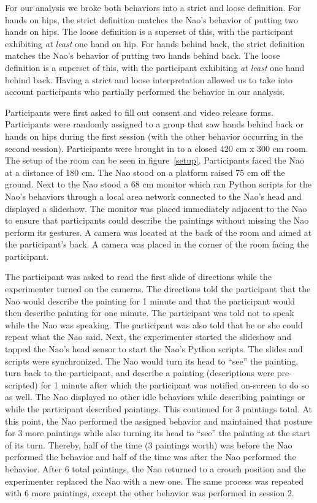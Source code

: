\documentclass{acm_proc_article-sp}
\begin{document}
For our analysis we broke both behaviors into a strict and loose definition. For hands on hips, the strict definition matches the Nao's behavior of putting two hands on hips. The loose definition is a superset of this, with the participant exhibiting \textit{at least} one hand on hip. For hands behind back, the strict definition matches the Nao's behavior of putting two hands behind back. The loose definition is a superset of this, with the participant exhibiting \textit{at least} one hand behind back. Having a strict and loose interpretation allowed us to take into account participants who partially performed the behavior in our analysis. 

Participants were first asked to fill out consent and video release forms. Participants were randomly assigned to a group that saw hands behind back or hands on hips during the first session (with the other behavior occurring in the second session). Participants were brought in to a closed 420 cm x 300 cm room. The setup of the room can be seen in figure~\ref{setup}. Participants faced the Nao at a distance of 180 cm. The Nao stood on a platform raised 75 cm off the ground. Next to the Nao stood a 68 cm monitor which ran Python scripts for the Nao's behaviors through a local area network connected to the Nao's head and displayed a slideshow. The monitor was placed immediately adjacent to the Nao to ensure that participants could describe the paintings without missing the Nao perform its gestures. A camera was located at the back of the room and aimed at the participant's back. A camera was placed in the corner of the room facing the participant.

The participant was asked to read the first slide of directions while the experimenter turned on the cameras. The directions told the participant that the Nao would describe the painting for 1 minute and that the participant would then describe painting for one minute. The participant was told not to speak while the Nao was speaking. The participant was also told that he or she could repeat what the Nao said. Next, the experimenter started the slideshow and tapped the Nao's head sensor to start the Nao's Python scripts. The slides and scripts were synchronized. The Nao would turn its head to ``see'' the painting, turn back to the participant, and describe a painting (descriptions were pre-scripted) for 1 minute after which the participant was notified on-screen to do so as well. The Nao displayed no other idle behaviors while describing paintings or while the participant described paintings. This continued for 3 paintings total. At this point, the Nao performed the assigned behavior and maintained that posture for 3 more paintings while also turning its head to ``see'' the painting at the start of its turn. Thereby, half of the time (3 paintings worth) was before the Nao performed the behavior and half of the time was after the Nao performed the behavior. After 6 total paintings, the Nao returned to a crouch position and the experimenter replaced the Nao with a new one. The same process was repeated with 6 more paintings, except the other behavior was performed in session 2. 
\end{document}

